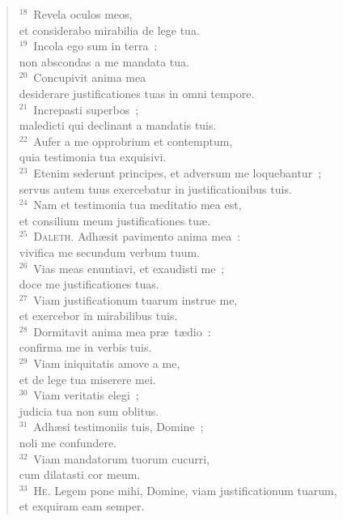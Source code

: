 \begin{verse}
${}^{18}$~Revela oculos meos,\\ et considerabo mirabilia de lege tua.\\
${}^{19}$~Incola ego sum in terra~:\\ non abscondas a me mandata tua.\\
${}^{20}$~Concupivit anima mea\\ desiderare justificationes tuas in omni tempore.\\
${}^{21}$~Increpasti superbos~;\\ maledicti qui declinant a mandatis tuis.\\
${}^{22}$~Aufer a me opprobrium et contemptum,\\ quia testimonia tua exquisivi.\\
${}^{23}$~Etenim sederunt principes, et adversum me loquebantur~;\\ servus autem tuus exercebatur in justificationibus tuis.\\
${}^{24}$~Nam et testimonia tua meditatio mea est,\\ et consilium meum justificationes tu\ae .\\
${}^{25}$~\textsc{Daleth.} Adh\ae sit pavimento anima mea~:\\ vivifica me secundum verbum tuum.\\
${}^{26}$~Vias meas enuntiavi, et exaudisti me~;\\ doce me justificationes tuas.\\
${}^{27}$~Viam justificationum tuarum instrue me,\\ et exercebor in mirabilibus tuis.\\
${}^{28}$~Dormitavit anima mea pr\ae\ t\ae dio~:\\ confirma me in verbis tuis.\\
${}^{29}$~Viam iniquitatis amove a me,\\ et de lege tua miserere mei.\\
${}^{30}$~Viam veritatis elegi~;\\ judicia tua non sum oblitus.\\
${}^{31}$~Adh\ae si testimoniis tuis, Domine~;\\ noli me confundere.\\
${}^{32}$~Viam mandatorum tuorum cucurri,\\ cum dilatasti cor meum.\\
${}^{33}$~\textsc{He.} Legem pone mihi, Domine, viam justificationum tuarum,\\ et exquiram eam semper.\\

\end{verse}
